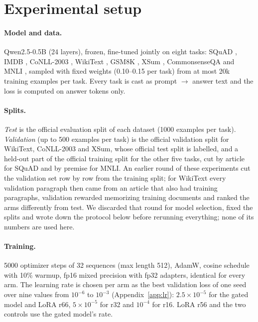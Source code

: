 \documentclass[11pt]{article}
\begin{document}
\section{Experimental setup}
\label{sec:setup}
\paragraph{Model and data.} Qwen2.5-0.5B \citep{qwen2025qwen25} (24 layers), frozen, fine-tuned
jointly on eight tasks: SQuAD \citep{rajpurkar2016squad}, IMDB \citep{maas2011imdb}, CoNLL-2003
\citep{tjong2003conll}, WikiText \citep{merity2016wikitext}, GSM8K \citep{cobbe2021gsm8k}, XSum
\citep{narayan2018xsum}, CommonsenseQA \citep{talmor2019commonsenseqa} and MNLI
\citep{williams2018mnli}, sampled with fixed weights (0.10--0.15 per task) from at most 20k
training examples per task. Every task is cast as prompt $\rightarrow$ answer text and the loss is
computed on answer tokens only.

\paragraph{Splits.} \emph{Test} is the official evaluation split of each dataset (1000 examples
per task). \emph{Validation} (up to 500 examples per task) is the official validation split
for WikiText, CoNLL-2003 and XSum, whose official test split is labelled, and a held-out part of
the official training split for the other five tasks, cut by article for SQuAD and by premise
for MNLI. An earlier round of these experiments
cut the validation set row by row from the training split; for WikiText every validation
paragraph then came from an article that also had training paragraphs, validation rewarded
memorizing training documents and ranked the arms differently from test. We discarded that round
for model selection, fixed the splits and wrote down the protocol below before rerunning
everything; none of its numbers are used here.

\paragraph{Training.} 5000 optimizer steps of 32 sequences (max length 512), AdamW, cosine
schedule with 10\% warmup, fp16 mixed precision with fp32 adapters, identical for every arm.
The learning rate is chosen per arm as the best validation loss of one seed over nine values
from $10^{-6}$ to $10^{-3}$ (Appendix~\ref{app:lr}): $2.5\times10^{-5}$ for the gated model and
LoRA r66, $5\times10^{-5}$ for r32 and $10^{-4}$ for r16. LoRA r56 and the two controls use the
gated model's rate.
\end{document}
